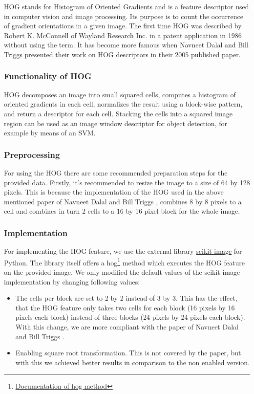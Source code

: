 \documentclass{scrartcl}
\begin{document}
HOG stands for Histogram of Oriented Gradients and is a feature descriptor used in computer vision and image processing. Its purpose is to count the occurrence of gradient orientations in a given image. The first time HOG was described by Robert K. McConnell of Wayland Research Inc. in a patent application in 1986 without using the term. It has become more famous when Navneet Dalal and Bill Triggs \cite{Hog_article} presented their work on HOG descriptors in their 2005 published paper.

\subsubsection{Functionality of HOG}

HOG decomposes an image into small squared cells, computes a histogram of oriented gradients in each cell, normalizes the result using a block-wise pattern, and return a descriptor for each cell. Stacking the cells into a squared image region can be used as an image window descriptor for object detection, for example by means of an SVM.

\subsubsection{Preprocessing}

For using the HOG there are some recommended preparation steps for the provided data. Firstly, it's recommended to resize the image to a size of 64 by 128 pixels. This is because the implementation of the HOG used in the above mentioned paper of Navneet Dalal and Bill Triggs \cite[p. 4]{Hog_article}, combines 8 by 8 pixels to a cell and combines in turn 2 cells to a 16 by 16 pixel block for the whole image.

\subsubsection{Implementation}

For implementing the HOG feature, we use the external library \href{https://scikit-image.org/}{scikit-image} for Python. The library itself offers a hog\footnote{\href{https://scikit-image.org/docs/dev/auto_examples/features_detection/plot_hog.html}{Documentation of hog method}} method which executes the HOG feature on the provided image. We only modified the default values of the scikit-image implementation by changing following values:
\begin{itemize}
  \item The cells per block are set to 2 by 2 instead of 3 by 3. This has the effect, that the HOG feature only takes two cells for each block (16 pixels by 16 pixels each block) instead of three blocks (24 pixels by 24 pixels each block). With this change, we are more compliant with the paper of Navneet Dalal and Bill Triggs \cite[p. 4]{Hog_article}.
  \item Enabling square root transformation. This is not covered by the paper, but with this we achieved better results in comparison to the non enabled version.
\end{itemize}
\end{document}

